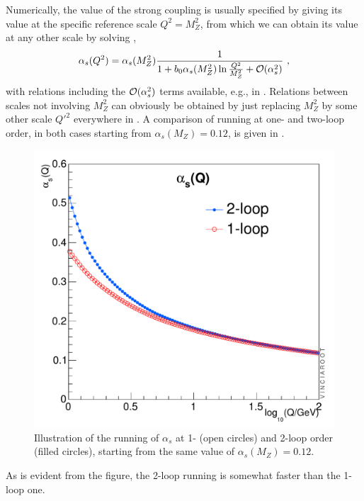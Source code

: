 %
Numerically, the value of the  strong coupling is usually specified by
giving its value at the specific 
reference scale $Q^2=M^2_Z$, from which we can obtain its
value at any other scale by solving , 
\begin{equation}
\alpha_s(Q^2) = \alpha_s(M_Z^2) \frac{1}{1+b_0
  \alpha_s(M_Z^2)\ln\frac{Q^2}{M_Z^2} + {\cal O}(\alpha_s^2)}~,
\label{eq:alphaq2}
\end{equation}
with relations including the ${\cal O}(\alpha_s^2)$ terms 
available, e.g., in \cite{Ellis:1991qj}. 
Relations between scales 
not involving $M_Z^2$ can obviously be obtained by just replacing $M_Z^2$
by some other scale $Q'^2$ everywhere in . A
comparison of running at one- and two-loop order, in both cases starting from
$\alpha_s(M_Z)=0.12$, is given in .
\begin{figure}[t]
\centering
\includegraphics*[scale=0.45]{vc-alphaS.pdf}
\caption{Illustration of the running of
 $\alpha_s$ at 1- (open 
  circles) and 2-loop
  order (filled circles), 
starting from the same value of $\alpha_s(M_Z)=0.12$. 
\label{fig:asRun}}
\end{figure}
As is evident from the figure, the 2-loop running is somewhat faster
than the 1-loop one.

